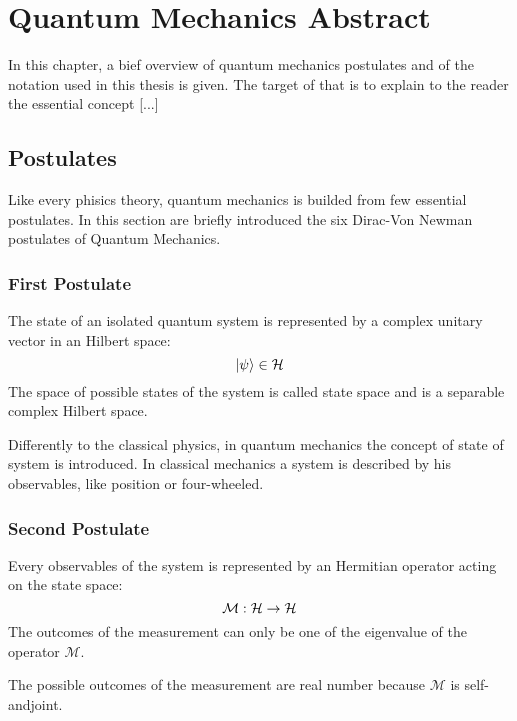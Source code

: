 \chapter{Quantum Mechanics Abstract}
    In this chapter, a bief overview of quantum mechanics postulates and
    of the notation used in this thesis is given. The target of that is 
    to explain to the reader the essential concept [...]

    \section{Postulates}
        Like every phisics theory, quantum mechanics is builded from few 
        essential postulates.
        In this section are briefly introduced the six Dirac-Von Newman 
        postulates of Quantum Mechanics.
        
        \subsection{First Postulate}
        \begin{postulate}
            The state of an isolated quantum system is represented by a complex unitary 
            vector in an Hilbert space:
            \begin{equation*}
                \ket{\psi} \in \mathcal{H}
            \end{equation*}
            The space of possible states of the system is called state space and is a
            separable complex Hilbert space.
            \label{post:1}
        \end{postulate}
        \begin{observation*}
            Differently to the classical physics, in quantum mechanics the concept
            of state of system is introduced. In classical mechanics a system is 
            described by his observables, like position or four-wheeled.
        \end{observation*}
        
        \subsection{Second Postulate}
        \begin{postulate}[Observables]
            Every observables of the system is represented by an Hermitian operator
            acting on the state space:
            \begin{equation*}
                \mathcal{M}:\mathcal{H}\to\mathcal{H}
            \end{equation*}
            The outcomes of the measurement can only be one of the eigenvalue of the 
            operator $\mathcal{M}$.
            \label{post:2}
        \end{postulate}
        \begin{observation*}
            The possible outcomes of the measurement are real number because $\mathcal{M}$
            is self-andjoint. 
        \end{observation*}

